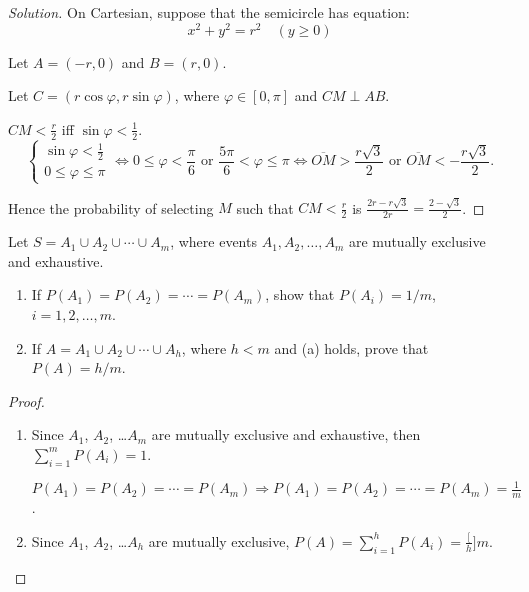 \documentclass[class=probandstats,crop=false]{standalone}
\begin{document}
\begin{proof}[Solution]
    \par On Cartesian, suppose that the semicircle has equation:
    \[
        x^{2} + y^{2} = r^{2}\quad (y \ge 0)
    \]
    \par Let $A = (-r, 0)$ and $B = (r, 0)$.
    \par Let $C = (r\cos\varphi, r\sin\varphi)$, where $\varphi\in[0,\pi]$ and $CM\perp AB$.
    \par $CM < \frac{r}{2}$ iff $\sin\varphi < \frac{1}{2}$.
    \[
        \begin{cases}
            \sin\varphi < \frac{1}{2} \\
            0\le \varphi\le \pi
        \end{cases}
        \Leftrightarrow
        0\le\varphi < \frac{\pi}{6} \text{ or } \frac{5\pi}{6} < \varphi \le\pi
        \Leftrightarrow
        \overline{OM} > \frac{r\sqrt{3}}{2} \text{ or } \overline{OM} < -\frac{r\sqrt{3}}{2}.
    \]
    \par Hence the probability of selecting $M$ such that $CM < \frac{r}{2}$ is $\frac{2r - r\sqrt{3}}{2r} = \frac{2 - \sqrt{3}}{2}$.
\end{proof}

\begin{exercise}
    \par Let $S = A_{1} \cup A_{2} \cup \cdots \cup A_{m}$, where events $A_{1}, A_{2}, \ldots, A_{m}$ are mutually exclusive and exhaustive.
    \begin{enumerate}[label = \textbf{(\alph*)}]
        \item If $P(A_{1}) = P(A_{2}) = \cdots = P(A_{m})$, show that $P(A_{i}) = 1/m$, $i = 1, 2, \ldots, m$.
        \item If $A = A_{1}\cup A_{2}\cup \cdots\cup A_{h}$, where $h < m$ and (a) holds, prove that $P(A) = h/m$.
    \end{enumerate}
\end{exercise}

\begin{proof}
    \begin{enumerate}[label = \textbf{(\alph*)}]
        \item Since $A_{1}$, $A_{2}$, \ldots $A_{m}$ are mutually exclusive and exhaustive, then $\sum^{m}_{i=1}P(A_{i}) = 1$.
              \par $P(A_{1}) = P(A_{2}) = \cdots = P(A_{m}) \Longrightarrow P(A_{1}) = P(A_{2}) = \cdots = P(A_{m}) = \frac{1}{m}$.
        \item Since $A_{1}$, $A_{2}$, \ldots $A_{h}$ are mutually exclusive, $P(A) = \sum^{h}_{i=1}P(A_{i}) = \frac[h]{m}$.
    \end{enumerate}
\end{proof}
\end{document}
